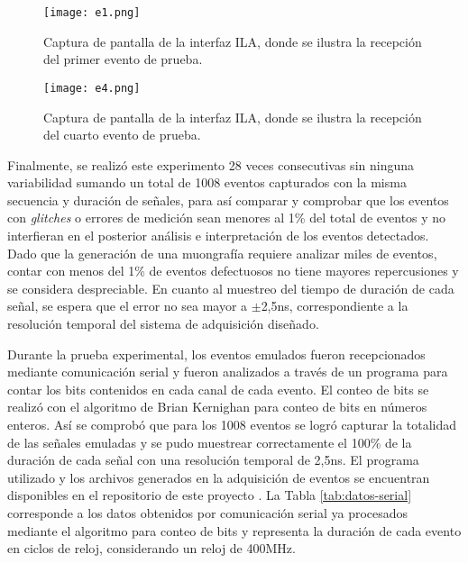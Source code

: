 	\begin{figure}[ht]
		\centering
		\texttt{[image: e1.png]}
		\caption{Captura de pantalla de la interfaz ILA, donde se ilustra la recepción del primer evento de prueba.}
		\label{img:e1}
	\end{figure}
	
	
	\begin{figure}[ht]
		\centering
		\texttt{[image: e4.png]}
		\caption{Captura de pantalla de la interfaz ILA, donde se ilustra la recepción del cuarto evento de prueba.}
		\label{img:e4}
	\end{figure}

	Finalmente, se realizó este experimento 28 veces consecutivas sin ninguna variabilidad sumando un total de 1008 eventos capturados con la misma secuencia y duración de señales, para así comparar y comprobar que los eventos con \textit{glitches} o errores de medición sean menores al 1\% del total de eventos y no interfieran en el posterior análisis e interpretación de los eventos detectados. Dado que la generación de una muongrafía requiere analizar miles de eventos, contar con menos del 1\% de eventos defectuosos no tiene mayores repercusiones y se considera despreciable. En cuanto al muestreo del tiempo de duración de cada señal, se espera que el error no sea mayor a $\pm$2,5ns, correspondiente a la resolución temporal del sistema de adquisición diseñado. %
	
	Durante la prueba experimental, los eventos emulados fueron recepcionados mediante comunicación serial y fueron analizados a través de un programa para contar los bits contenidos en cada canal de cada evento. El conteo de bits se realizó con el algoritmo de Brian Kernighan\cite{SinghCountC++} para conteo de bits en números enteros. Así se comprobó que para los 1008 eventos se logró capturar la totalidad de las señales emuladas y se pudo muestrear correctamente el 100\% de la duración de cada señal con una resolución temporal de 2,5ns. El programa utilizado y los archivos generados en la adquisición de eventos se encuentran disponibles en el repositorio de este proyecto \cite{GonzalezMuonRepository}. La Tabla \ref{tab:datos-serial} corresponde a los datos obtenidos por comunicación serial ya procesados mediante el algoritmo para conteo de bits y representa la duración de cada evento en ciclos de reloj, considerando un reloj de 400MHz.	
	
